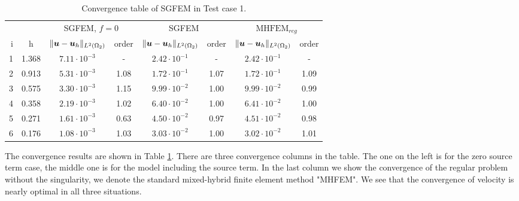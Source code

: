 \begin{table}[!htb]
\begin{center}
\bgroup
\def\arraystretch{1.2}
\setlength\tabcolsep{5pt}
\begin{tabular}{rc|cc|cc|cc}
\toprule
\multicolumn{2}{c|}{} & \multicolumn{2}{c|}{ SGFEM, $f=0$} & \multicolumn{2}{c|}{SGFEM} & \multicolumn{2}{c}{$\textrm{MHFEM}_{reg}$}\\ [3pt] %
i & h & $\|\mathbf{\boldsymbol{u}}-\mathbf{\boldsymbol{u}}_h\|_{L^2(\Omega_2)}$ & order & $\|\mathbf{\boldsymbol{u}}-\mathbf{\boldsymbol{u}}_h\|_{L^2(\Omega_2)}$
    & order & $\|\mathbf{\boldsymbol{u}}-\mathbf{\boldsymbol{u}}_h\|_{L^2(\Omega_2)}$ & order \\ [3pt] \midrule
1 & 1.368 &  $7.11\cdot10^{-3}$  &  -   &  $2.42\cdot10^{-1}$  &  -   &  $2.42\cdot10^{-1}$ &   -   \\
2 & 0.913 &  $5.31\cdot10^{-3}$  & 1.08 &  $1.72\cdot10^{-1}$  & 1.07 &  $1.72\cdot10^{-1}$ &  1.09 \\
3 & 0.575 &  $3.30\cdot10^{-3}$  & 1.15 &  $9.99\cdot10^{-2}$  & 1.00 &  $9.99\cdot10^{-2}$ &  0.99 \\
4 & 0.358 &  $2.19\cdot10^{-3}$  & 1.02 &  $6.40\cdot10^{-2}$  & 1.00 &  $6.41\cdot10^{-2}$ &  1.00 \\
5 & 0.271 &  $1.61\cdot10^{-3}$  & 0.63 &  $4.50\cdot10^{-2}$  & 0.97 &  $4.51\cdot10^{-2}$ &  0.98 \\
6 & 0.176 &  $1.08\cdot10^{-3}$  & 1.03 &  $3.03\cdot10^{-2}$  & 1.00 &  $3.02\cdot10^{-2}$ &  1.01 \\
\bottomrule
\end{tabular}
\caption{Convergence table of SGFEM in Test case 1.}
\label{tab:mh_tc1_convergence}
\egroup
\end{center}
\end{table}

The convergence results are shown in Table \ref{tab:mh_tc1_convergence}.
There are three convergence columns in the table. The one on the left is for the zero source term case,
the middle one is for the model including the source term.
In the last column we show the convergence of the regular problem without the singularity, we denote
the standard mixed-hybrid finite element method "MHFEM".
We see that the convergence of velocity is nearly optimal in all three situations.


